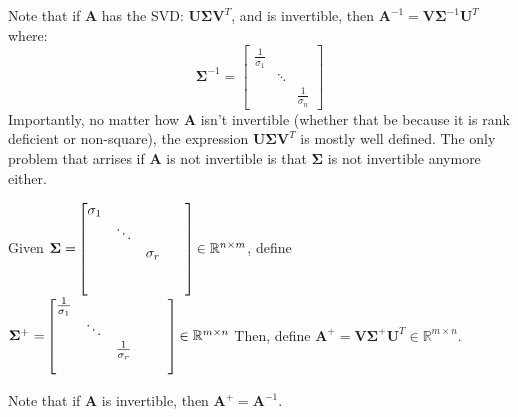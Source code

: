 \documentclass{book}
\newcommand{\hTwo}{%
   \color{MidnightBlue}%
   \fontsize{13}{15}\selectfont%
}
\newcommand{\hFour}{%
   \color{Cerulean}
   \fontsize{12}{14}\selectfont%
}
\newenvironment{myIndent}{%
   \begin{adjustwidth}{2.5em}{0em}%
}{%
   \end{adjustwidth}%
}
\newenvironment{myTindent}{%
   \begin{adjustwidth}{7.5em}{0em}%
}{%
   \end{adjustwidth}%
}
\newcommand{\mySepTwo}[1][.]{%
   {\noindent\color{#1}{\rule{6.5in}{0.5mm}}}\\%
}
\newcommand{\retTwo}{\hfill\bigbreak}
\newcommand{\mMat}[1]{\mathbf{#1}}
\begin{document}
   {\begin{myIndent} \hTwo
      Note that if $\mMat{A}$ has the SVD: $\mMat{U}\bm{\Sigma}\mMat{V}^T$, and is invertible, then $\mMat{A}^{-1} = \mMat{V}\bm{\Sigma}^{-1}\mMat{U}^T$ where: \[
         \bm{\Sigma}^{-1} = \begin{bmatrix}
         \frac{1}{\sigma_1} & & \\
         & \ddots & \\
         & & \frac{1}{\sigma_n}
      \end{bmatrix}\]
      \retTwo
      Importantly, no matter how $\mMat{A}$ isn't invertible (whether that be because it is rank deficient or non-square), the expression $\mMat{U}\bm{\Sigma}\mMat{V}^T$ is mostly well defined. The only problem that arrises if $\mMat{A}$ is not invertible is that $\bm{\Sigma}$ is not invertible anymore either. \retTwo

      Given ${\bm{\Sigma} =} 
      \begin{bmatrix}
         \sigma_1 & \\
         & \ddots \\
         & & \sigma_r \\
         & & & \\
         & & & \hspace{0.8em}\vphantom{\int}\\
      \end{bmatrix} {\in \mathbb{R}^{n \times m}}$, define ${\bm{\Sigma}^+ =} 
      \begin{bmatrix}
         \frac{1}{\sigma_1} & \\
         & \ddots \\
         & & \frac{1}{\sigma_r} \\
         & & & \hspace{0.8em}\vphantom{\int}\hspace{0.8em} \\ 
      \end{bmatrix} {\in \mathbb{R}^{m \times n}}$ \retTwo
      Then, define $\mMat{A}^+ = \mMat{V}\bm{\Sigma}^+\mMat{U}^T \in \mathbb{R}^{m\times n}$.
      
      {\begin{myTindent} \hFour
         Note that if $\mMat{A}$ is invertible, then $\mMat{A}^+ = \mMat{A}^{-1}$.
      \end{myTindent}}
   \end{myIndent}}

   \mySepTwo
\end{document}
